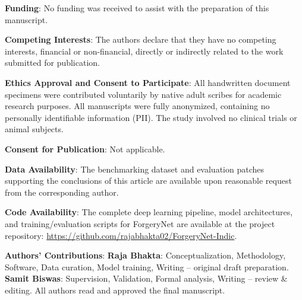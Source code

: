 \documentclass[pdflatex,sn-mathphys-num,iicol]{sn-jnl}
\begin{document}
\noindent\textbf{Funding}: No funding was received to assist with the preparation of this manuscript.

\vspace{0.5em}
\noindent\textbf{Competing Interests}: The authors declare that they have no competing interests, financial or non-financial, directly or indirectly related to the work submitted for publication.

\vspace{0.5em}
\noindent\textbf{Ethics Approval and Consent to Participate}: All handwritten document specimens were contributed voluntarily by native adult scribes for academic research purposes. All manuscripts were fully anonymized, containing no personally identifiable information (PII). The study involved no clinical trials or animal subjects.

\vspace{0.5em}
\noindent\textbf{Consent for Publication}: Not applicable.

\vspace{0.5em}
\noindent\textbf{Data Availability}: The benchmarking dataset and evaluation patches supporting the conclusions of this article are available upon reasonable request from the corresponding author.

\vspace{0.5em}
\noindent\textbf{Code Availability}: The complete deep learning pipeline, model architectures, and training/evaluation scripts for ForgeryNet are available at the project repository: \url{https://github.com/rajabhakta02/ForgeryNet-Indic}.

\vspace{0.5em}
\noindent\textbf{Authors' Contributions}: 
\textbf{Raja Bhakta}: Conceptualization, Methodology, Software, Data curation, Model training, Writing -- original draft preparation. 
\textbf{Samit Biswas}: Supervision, Validation, Formal analysis, Writing -- review \& editing. All authors read and approved the final manuscript.


\end{document}

